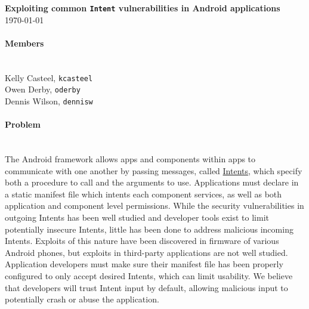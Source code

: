 \documentclass[12pt,a4paper,draft]{article}
\begin{document}


\flushleft\textbf{Exploiting common \texttt{Intent} vulnerabilities in Android %
applications}\\
\today\\

\paragraph{Members} ~\\

Kelly Casteel, \texttt{kcasteel}\\
Owen Derby, \texttt{oderby}\\
Dennis Wilson, \texttt{dennisw}\\

\paragraph{Problem} ~\\
The Android framework allows apps and components within apps to communicate with
one another by passing messages, called
\href{https://developer.android.com/reference/android/content/Intent.html}{Intents},
which specify both a procedure to call and the arguments to use. Applications
must declare in a static manifest file which intents each component services, as
well as both application and component level permissions. While the security
vulnerabilities in outgoing Intents has been well studied
\cite{chin_analyzing_2011} and developer tools exist to limit potentially
insecure Intents, little has been done to address malicious incoming
Intents. Exploits of this nature have been discovered in firmware of various
Android phones\cite{grace_systematic_2012}, but exploits in third-party
applications are not well studied. Application developers must make sure their
manifest file has been properly configured to only accept desired Intents, which
can limit usability. We believe that developers will trust Intent input by
default, allowing malicious input to potentially crash or abuse the application.
\end{document}
